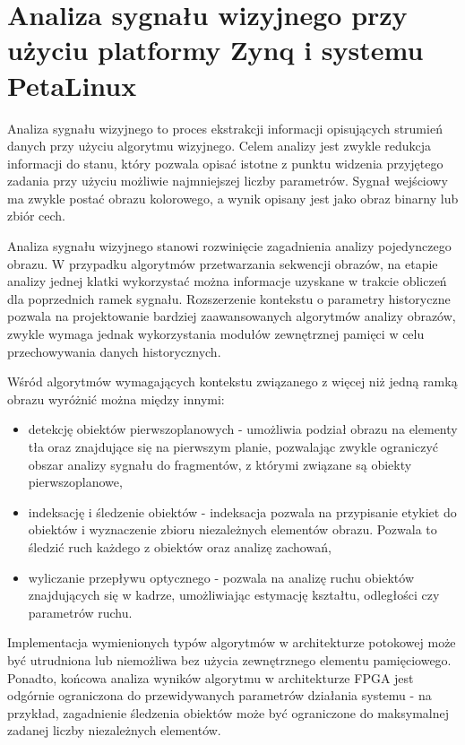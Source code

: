 \chapter{Analiza sygnału wizyjnego przy użyciu platformy Zynq i systemu PetaLinux}
\label{cha:project}



Analiza sygnału wizyjnego to proces ekstrakcji informacji opisujących strumień danych przy użyciu algorytmu wizyjnego. Celem analizy jest zwykle redukcja informacji do stanu, który pozwala opisać istotne z punktu widzenia przyjętego zadania przy użyciu możliwie najmniejszej liczby parametrów. Sygnał wejściowy ma zwykle postać obrazu kolorowego, a wynik opisany jest jako obraz binarny lub zbiór cech.

Analiza sygnału wizyjnego stanowi rozwinięcie zagadnienia analizy pojedynczego obrazu. W przypadku algorytmów przetwarzania sekwencji obrazów, na etapie analizy jednej klatki wykorzystać można informacje uzyskane w trakcie obliczeń dla poprzednich ramek sygnału. Rozszerzenie kontekstu o parametry historyczne pozwala na projektowanie bardziej zaawansowanych algorytmów analizy obrazów, zwykle wymaga jednak wykorzystania modułów zewnętrznej pamięci w celu przechowywania danych historycznych.

Wśród algorytmów wymagających kontekstu związanego z więcej niż jedną ramką obrazu wyróżnić można między innymi:
\begin{itemize}
	\item detekcję obiektów pierwszoplanowych - umożliwia podział obrazu na elementy tła oraz znajdujące się na pierwszym planie, pozwalając zwykle ograniczyć obszar analizy sygnału do fragmentów, z którymi związane są obiekty pierwszoplanowe,

	\item indeksację i śledzenie obiektów - indeksacja pozwala na przypisanie etykiet do obiektów i wyznaczenie zbioru niezależnych elementów obrazu. Pozwala to śledzić ruch każdego z obiektów oraz analizę zachowań,
	
	\item wyliczanie przepływu optycznego - pozwala na analizę ruchu obiektów znajdujących się w kadrze, umożliwiając estymację kształtu, odległości czy parametrów ruchu.
\end{itemize}

Implementacja wymienionych typów algorytmów w architekturze potokowej może być utrudniona lub niemożliwa bez użycia zewnętrznego elementu pamięciowego. Ponadto, końcowa analiza wyników algorytmu w architekturze FPGA jest odgórnie ograniczona do przewidywanych parametrów działania systemu - na przykład, zagadnienie śledzenia obiektów może być ograniczone do maksymalnej zadanej liczby niezależnych elementów.

